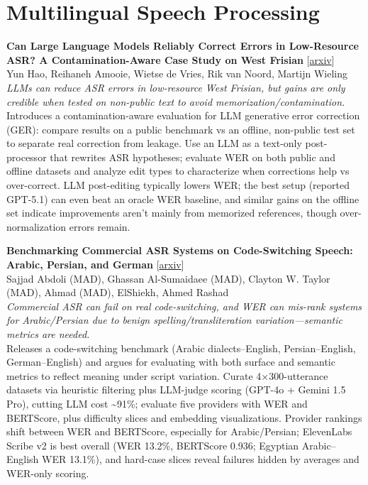 \documentclass[12pt,letterpaper]{article}
\begin{document}
\medskip


\section*{Multilingual Speech Processing}

{\small\textbf{Can Large Language Models Reliably Correct Errors in Low-Resource ASR? A Contamination-Aware Case Study on West Frisian}} {\scriptsize[\href{https://arxiv.org/abs/2605.19711}{arxiv}]}\\
{\scriptsize Yun Hao, Reihaneh Amooie, Wietse de Vries, Rik van Noord, Martijn Wieling}\\

{\small\textit{LLMs can reduce ASR errors in low-resource West Frisian, but gains are only credible when tested on non-public text to avoid memorization/contamination.}}\\[1pt]
{\footnotesize Introduces a contamination-aware evaluation for LLM generative error correction (GER): compare results on a public benchmark vs an offline, non-public test set to separate real correction from leakage. Use an LLM as a text-only post-processor that rewrites ASR hypotheses; evaluate WER on both public and offline datasets and analyze edit types to characterize when corrections help vs over-correct. LLM post-editing typically lowers WER; the best setup (reported GPT-5.1) can even beat an oracle WER baseline, and similar gains on the offline set indicate improvements aren't mainly from memorized references, though over-normalization errors remain.}

\medskip

{\small\textbf{Benchmarking Commercial ASR Systems on Code-Switching Speech: Arabic, Persian, and German}} {\scriptsize[\href{https://arxiv.org/abs/2605.19069}{arxiv}]}\\
{\scriptsize Sajjad Abdoli (MAD), Ghassan Al-Sumaidaee (MAD), Clayton W. Taylor (MAD),  Ahmad (MAD),  ElShiekh, Ahmed Rashad}\\

{\small\textit{Commercial ASR can fail on real code-switching, and WER can mis-rank systems for Arabic/Persian due to benign spelling/transliteration variation---semantic metrics are needed.}}\\[1pt]
{\footnotesize Releases a code-switching benchmark (Arabic dialects--English, Persian--English, German--English) and argues for evaluating with both surface and semantic metrics to reflect meaning under script variation. Curate 4×300-utterance datasets via heuristic filtering plus LLM-judge scoring (GPT-4o + Gemini 1.5 Pro), cutting LLM cost \textasciitilde{}91\%; evaluate five providers with WER and BERTScore, plus difficulty slices and embedding visualizations. Provider rankings shift between WER and BERTScore, especially for Arabic/Persian; ElevenLabs Scribe v2 is best overall (WER 13.2\%, BERTScore 0.936; Egyptian Arabic--English WER 13.1\%), and hard-case slices reveal failures hidden by averages and WER-only scoring.}
\end{document}
